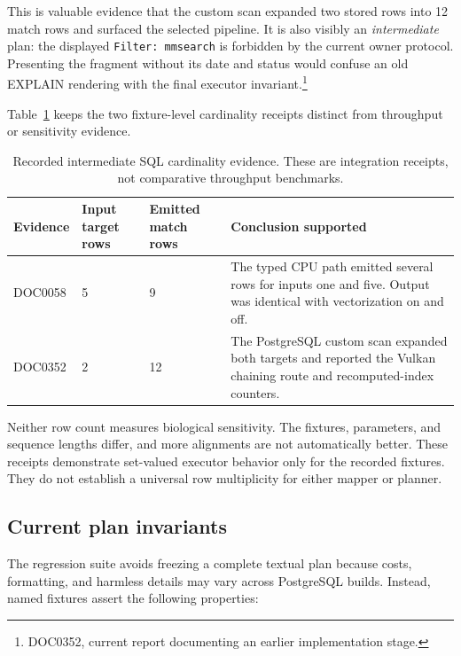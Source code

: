 This is valuable evidence that the custom scan expanded two stored rows into
12 match rows and surfaced the selected pipeline.  It is also visibly an
\emph{intermediate} plan: the displayed \texttt{Filter: mmsearch} is forbidden
by the current owner protocol.  Presenting the fragment without its date and
status would confuse an old EXPLAIN rendering with the final executor
invariant.\footnote{DOC0352, current report documenting an earlier
implementation stage.}

Table~\ref{tab:customscan-cardinality-evidence} keeps the two fixture-level
cardinality receipts distinct from throughput or sensitivity evidence.

\begin{table}[htbp]
\centering
\small
\caption{Recorded intermediate SQL cardinality evidence.  These are
integration receipts, not comparative throughput benchmarks.}
\label{tab:customscan-cardinality-evidence}
\begin{tabular}{@{}p{}p{}p{}p{}@{}}
\toprule
Evidence & Input target rows & Emitted match rows & Conclusion supported \\
\midrule
DOC0058 &
5 &
9 &
The typed CPU path emitted several rows for inputs one and five.  Output was
identical with vectorization on and off. \\
DOC0352 &
2 &
12 &
The PostgreSQL custom scan expanded both targets and reported the Vulkan
chaining route and recomputed-index counters. \\
\bottomrule
\end{tabular}
\end{table}

Neither row count measures biological sensitivity.  The fixtures, parameters,
and sequence lengths differ, and more alignments are not automatically better.
These receipts demonstrate set-valued executor behavior only for the recorded
fixtures.  They do not establish a universal row multiplicity for either
mapper or planner.

\subsection{Current plan invariants}

The regression suite avoids freezing a complete textual plan because costs,
formatting, and harmless details may vary across PostgreSQL builds.  Instead,
named fixtures assert the following properties:

